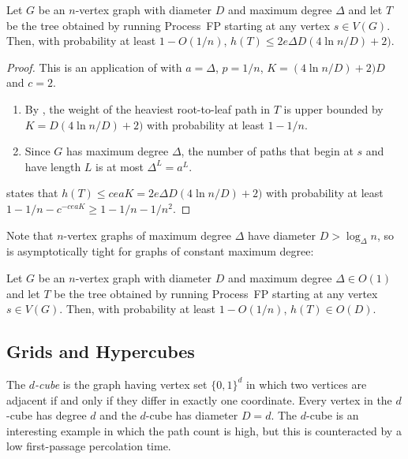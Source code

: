 \documentclass{patmorin}
\begin{document}
\begin{thm}
  Let $G$ be an $n$-vertex graph with diameter $D$ and maximum degree $\Delta$
  and let $T$ be the tree obtained by running Process~FP starting at
  any vertex $s\in V(G)$.  Then, with probability at least $1-O(1/n)$,
  $h(T)\le 2e\Delta D(4\ln n/D)+2)$.
\end{thm}

\begin{proof}
  This is an application of  with $a=\Delta$, $p=1/n$,
  $K=(4\ln n/D)+2)D$ and $c=2$.
  \begin{enumerate}
     \item By , the weight of the heaviest
       root-to-leaf path in $T$ is upper bounded by $K=D(4\ln n/D)+2)$ 
       with probability
       at least $1-1/n$.
     \item Since $G$ has maximum degree $\Delta$, the number of paths
       that begin at $s$ and have length $L$ is at most $\Delta^L=a^L$.
  \end{enumerate}
   states that $h(T)\le ceaK = 2e\Delta D(4\ln n/D)+2)$ with probability at least $1-1/n-c^{-ceaK}\ge 1-1/n-1/n^2$.
\end{proof}

Note that $n$-vertex graphs of maximum degree $\Delta$ have diameter
$D>\log_\Delta n$, so  is asymptotically
tight for graphs of constant maximum degree:

\begin{cor}
  Let $G$ be an $n$-vertex graph with diameter $D$ and maximum degree
  $\Delta\in O(1)$ and let $T$ be the tree obtained by running Process~FP
  starting at any vertex $s\in V(G)$.  Then, with probability at least
  $1-O(1/n)$, $h(T)\in O(D)$.
\end{cor}

\subsection{Grids and Hypercubes}

The \emph{$d$-cube} is the graph having vertex set $\{0,1\}^d$ in
which two vertices are adjacent if and only if they differ in exactly
one coordinate.  Every vertex in the $d$-cube has degree $d$ and the
$d$-cube has diameter $D=d$.  The $d$-cube is an interesting example
in which the path count is high, but this is counteracted by a low
first-passage percolation time.
\end{document}
